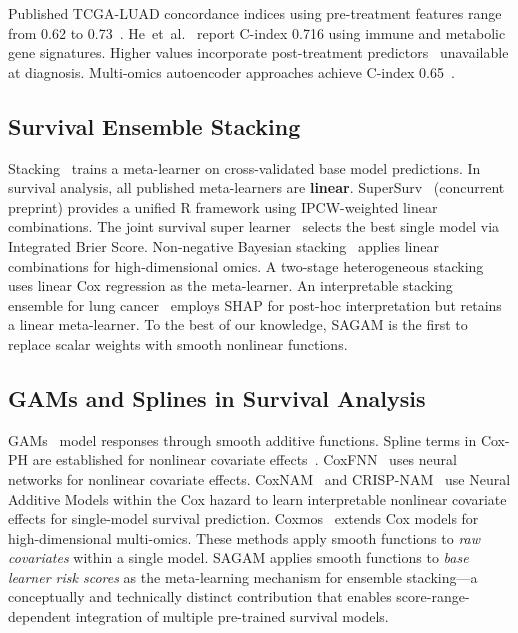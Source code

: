 \documentclass[conference]{IEEEtran}
\begin{document}
Published TCGA-LUAD concordance indices using pre-treatment features range
from 0.62 to 0.73~\cite{astley2022lung,he2024immune}.
He~et~al.~\cite{he2024immune} report C-index 0.716 using immune and
metabolic gene signatures.
Higher values incorporate post-treatment predictors~\cite{bartholomai2019survival}
unavailable at diagnosis.
Multi-omics autoencoder approaches achieve C-index 0.65~\cite{chen2020multiomics}.

\subsection{Survival Ensemble Stacking}

Stacking~\cite{van2007super} trains a meta-learner on cross-validated base
model predictions.
In survival analysis, all published meta-learners are \textbf{linear}.
SuperSurv~\cite{lyu2026supersurv} (concurrent preprint) provides a unified
R framework using IPCW-weighted linear combinations.
The joint survival super learner~\cite{golmakani2024joint} selects the best
single model via Integrated Brier Score.
Non-negative Bayesian stacking~\cite{zhao2024bayesian} applies linear
combinations for high-dimensional omics.
A two-stage heterogeneous stacking~\cite{huang2023twostage} uses linear
Cox regression as the meta-learner.
An interpretable stacking ensemble for lung cancer~\cite{effective2024lung}
employs SHAP for post-hoc interpretation but retains a linear meta-learner.
To the best of our knowledge, SAGAM is the first to replace scalar weights with smooth nonlinear functions.

\subsection{GAMs and Splines in Survival Analysis}

GAMs~\cite{hastie1990gam} model responses through smooth additive functions.
Spline terms in Cox-PH are established for nonlinear covariate
effects~\cite{therneau2000modeling}.
CoxFNN~\cite{coxfnn2024} uses neural networks for nonlinear covariate effects.
CoxNAM~\cite{coxnam2023} and CRISP-NAM~\cite{crispnam2025} use Neural
Additive Models within the Cox hazard to learn interpretable nonlinear
covariate effects for single-model survival prediction.
Coxmos~\cite{coxmos2025} extends Cox models for high-dimensional multi-omics.
These methods apply smooth functions to \emph{raw covariates} within a
single model.
SAGAM applies smooth functions to \emph{base learner risk scores} as
the meta-learning mechanism for ensemble stacking---a conceptually and
technically distinct contribution that enables score-range-dependent
integration of multiple pre-trained survival models.
\end{document}
